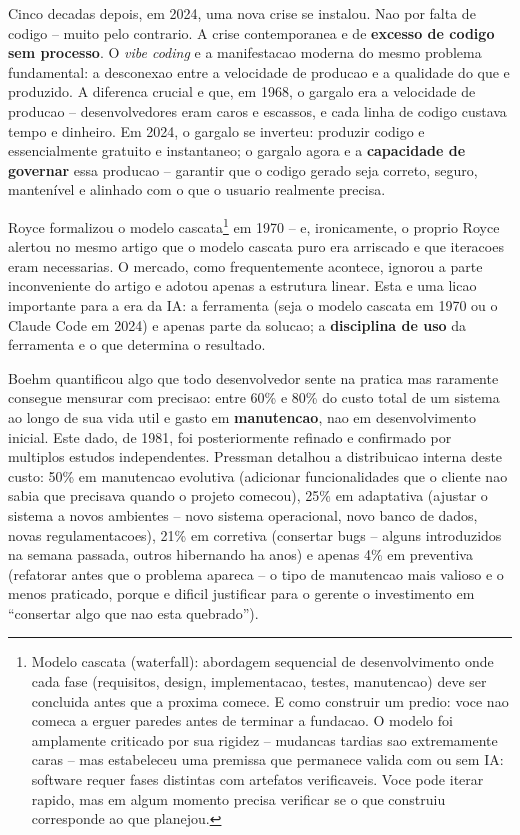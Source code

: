 \documentclass[12pt,a4paper,oneside,sumario=tradicional,chapter=TITLE,section=TITLE,subsection=TITLE,english,brazil]{abntex2}
\begin{document}
Cinco decadas depois, em 2024, uma nova crise se instalou. Nao por falta de codigo -- muito pelo contrario. A crise contemporanea e de \textbf{excesso de codigo sem processo}. O \textit{vibe coding} \cite{macedo2026engenharia} e a manifestacao moderna do mesmo problema fundamental: a desconexao entre a velocidade de producao e a qualidade do que e produzido. A diferenca crucial e que, em 1968, o gargalo era a velocidade de producao -- desenvolvedores eram caros e escassos, e cada linha de codigo custava tempo e dinheiro. Em 2024, o gargalo se inverteu: produzir codigo e essencialmente gratuito e instantaneo; o gargalo agora e a \textbf{capacidade de governar} essa producao -- garantir que o codigo gerado seja correto, seguro, mantenível e alinhado com o que o usuario realmente precisa.

Royce \cite{royce1970managing} formalizou o modelo cascata\footnote{Modelo cascata (waterfall): abordagem sequencial de desenvolvimento onde cada fase (requisitos, design, implementacao, testes, manutencao) deve ser concluida antes que a proxima comece. E como construir um predio: voce nao comeca a erguer paredes antes de terminar a fundacao. O modelo foi amplamente criticado por sua rigidez -- mudancas tardias sao extremamente caras -- mas estabeleceu uma premissa que permanece valida com ou sem IA: software requer fases distintas com artefatos verificaveis. Voce pode iterar rapido, mas em algum momento precisa verificar se o que construiu corresponde ao que planejou.} em 1970 -- e, ironicamente, o proprio Royce alertou no mesmo artigo que o modelo cascata puro era arriscado e que iteracoes eram necessarias. O mercado, como frequentemente acontece, ignorou a parte inconveniente do artigo e adotou apenas a estrutura linear. Esta e uma licao importante para a era da IA: a ferramenta (seja o modelo cascata em 1970 ou o Claude Code em 2024) e apenas parte da solucao; a \textbf{disciplina de uso} da ferramenta e o que determina o resultado.

Boehm \cite{boehm1981software} quantificou algo que todo desenvolvedor sente na pratica mas raramente consegue mensurar com precisao: entre 60\% e 80\% do custo total de um sistema ao longo de sua vida util e gasto em \textbf{manutencao}, nao em desenvolvimento inicial. Este dado, de 1981, foi posteriormente refinado e confirmado por multiplos estudos independentes. Pressman \cite{pressman2014software} detalhou a distribuicao interna deste custo: 50\% em manutencao evolutiva (adicionar funcionalidades que o cliente nao sabia que precisava quando o projeto comecou), 25\% em adaptativa (ajustar o sistema a novos ambientes -- novo sistema operacional, novo banco de dados, novas regulamentacoes), 21\% em corretiva (consertar bugs -- alguns introduzidos na semana passada, outros hibernando ha anos) e apenas 4\% em preventiva (refatorar antes que o problema apareca -- o tipo de manutencao mais valioso e o menos praticado, porque e dificil justificar para o gerente o investimento em ``consertar algo que nao esta quebrado'').
\end{document}
